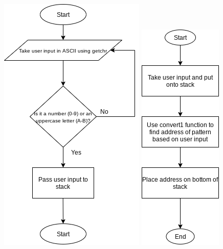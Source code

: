 \documentclass[12pt]{article}
\begin{document}
\begin{figure}
    \centering
    \includegraphics[scale=0.5]{Lab4/Lab4a.png}
    \includegraphics[scale=0.5]{Lab4/Lab4b.png}

\end{figure}
\end{document}

